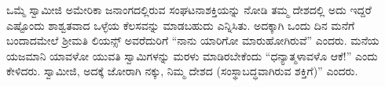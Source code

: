  ಒಮ್ಮೆ ಸ್ವಾಮೀಜಿ ಅಮೇರಿಕಾ ಜನಾಂಗದಲ್ಲಿರುವ ಸಂಘಟನಾಶಕ್ತಿಯನ್ನು ನೋಡಿ ತಮ್ಮ ದೇಶದಲ್ಲಿ ಅದು ಇದ್ದರೆ ಎಷ್ಟೊಂದು ಶಾಶ್ವತವಾದ ಒಳ್ಳೆಯ ಕೆಲಸವನ್ನು ಮಾಡಬಹುದು ಎನ್ನಿಸಿತು. ಅದಕ್ಕಾಗಿ ಒಂದು ದಿನ ಮನೆಗೆ ಬಂದಾದಮೇಲೆ ಶ‍್ರೀಮತಿ ಲಿಯನ್ಸ್ ಅವರೆದುರಿಗೆ “ನಾನು ಯಾರಿಗೋ ಮಾರುಹೋಗಿರುವೆ” ಎಂದರು. ಮನೆಯ ಯಜಮಾನಿ ಯಾವಳೋ ಯುವತಿ ಸ್ವಾಮಿಗಳನ್ನು ಮರಳು ಮಾಡಿರಬೇಕೆಂದು “ಧನ್ಯಾತ್ಮಳಾವಳೊ ಆಕೆ!” ಎಂದು ಕೇಳಿದರು. ಸ್ವಾಮೀಜಿ, ಅದಕ್ಕೆ ಜೋರಾಗಿ ನಕ್ಕು, ನಿಮ್ಮ ದೇಶದ  (ಸಂಸ್ಥಾಬದ್ಧವಾಗಿರುವ ಶಕ್ತಿಗೆ)” ಎಂದರು. 


